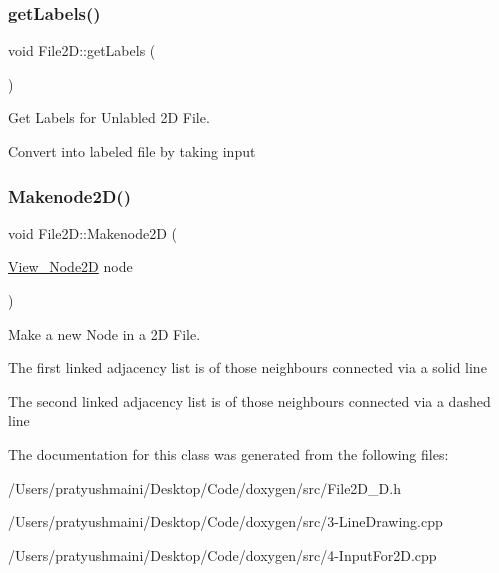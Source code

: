\subsubsection{\texorpdfstring{get\+Labels()}{getLabels()}}
{\footnotesize\ttfamily void File2\+D\+::get\+Labels (\begin{DoxyParamCaption}{ }\end{DoxyParamCaption})}



Get Labels for Unlabled 2D File. 

Convert into labeled file by taking input \mbox{\label{class_file2_d_a83bb7013172551ad378303df7f0001a9}} 
\subsubsection{\texorpdfstring{Makenode2\+D()}{Makenode2D()}}
{\footnotesize\ttfamily void File2\+D\+::\+Makenode2D (\begin{DoxyParamCaption}\item[{\mbox{\hyperlink{class_view___node2_d}{View\+\_\+\+Node2D}}}]{node }\end{DoxyParamCaption})}



Make a new Node in a 2D File. 

The first linked adjacency list is of those neighbours connected via a solid line

The second linked adjacency list is of those neighbours connected via a dashed line 

The documentation for this class was generated from the following files\+:\begin{DoxyCompactItemize}
\item 
/\+Users/pratyushmaini/\+Desktop/\+Code/doxygen/src/File2\+D\+\_\+D.\+h\item 
/\+Users/pratyushmaini/\+Desktop/\+Code/doxygen/src/3-\/\+Line\+Drawing.\+cpp\item 
/\+Users/pratyushmaini/\+Desktop/\+Code/doxygen/src/4-\/\+Input\+For2\+D.\+cpp\end{DoxyCompactItemize}
